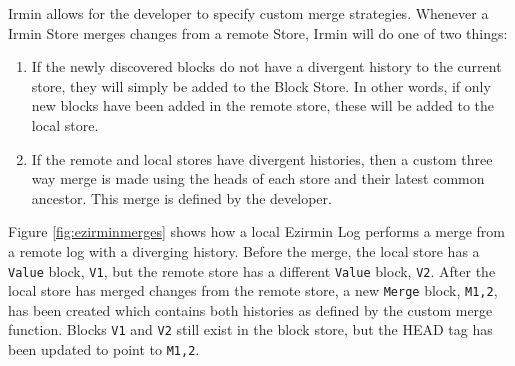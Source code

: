 \documentclass[12pt,a4paper,twoside,openright]{report}
\begin{document}
	Irmin allows for the developer to specify custom merge strategies. 
	Whenever a Irmin Store merges changes from a remote Store, Irmin will do one of two things:
	\begin{enumerate}
		\item If the newly discovered blocks do not have a divergent history to the current store, they will simply be added to the Block Store. 
			In other words, if only new blocks have been added in the remote store, these will be added to the local store. 
		\item If the remote and local stores have divergent histories, then a custom three way merge is made using the heads of each store and their latest common ancestor.
			This merge is defined by the developer.
	\end{enumerate}
	Figure \ref{fig:ezirminmerges} shows how a local Ezirmin Log performs a merge from a remote log with a diverging history.
	Before the merge, the local store has a \texttt{Value} block, \texttt{V1}, but the remote store has a different \texttt{Value} block, \texttt{V2}.
	After the local store has merged changes from the remote store, a new \texttt{Merge} block, \texttt{M1,2}, has been created which contains both histories as defined by the custom merge function. 
	Blocks \texttt{V1} and \texttt{V2} still exist in the block store, but the HEAD tag has been updated to point to \texttt{M1,2}. \\
\end{document}
